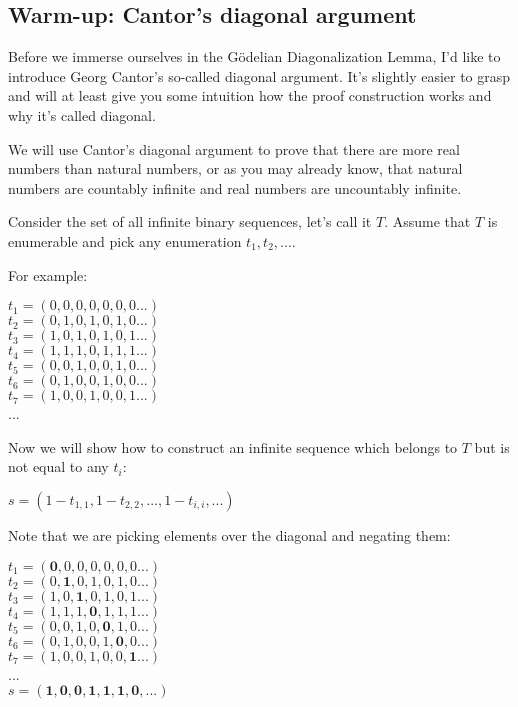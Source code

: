 \documentclass{article}
\begin{document}
\subsection{Warm-up: Cantor's diagonal argument}

Before we immerse ourselves in the Gödelian Diagonalization Lemma,
I'd like to introduce Georg Cantor's so-called diagonal argument.
It's slightly easier to grasp and will at least give you some intuition how
the proof construction works and why it's called diagonal.

We will use Cantor's diagonal argument to prove that there are more real
numbers than natural numbers, or as you may already know, that
natural numbers are countably infinite and real numbers are uncountably
infinite.

Consider the set of all infinite binary sequences, let's call it $T$.
Assume that $T$ is enumerable and pick any enumeration $t_1, t_2, ...$.

For example:

\begin{center}
    $t_1 = (0, 0, 0, 0, 0, 0, 0...)$\\
    $t_2 = (0, 1, 0, 1, 0, 1, 0 ...)$\\
    $t_3 = (1, 0, 1, 0, 1, 0, 1 ...)$\\
    $t_4 = (1, 1, 1, 0, 1, 1, 1 ...)$\\
    $t_5 = (0, 0, 1, 0, 0, 1, 0 ...)$\\
    $t_6 = (0, 1, 0, 0, 1, 0, 0 ...)$\\
    $t_7 = (1, 0, 0, 1, 0, 0, 1 ...)$\\
    ...\\
\end{center}

Now we will show how to construct an infinite sequence which belongs to
$T$ but is not equal to any $t_i$:

\begin{center}
    $s = (1-t_{1,1}, 1-t_{2,2}, ..., 1-t_{i,i}, ...)$
\end{center}

Note that we are picking elements over the diagonal and negating them:

\begin{center}
    $t_1 = (\mathbf{0}, 0, 0, 0, 0, 0, 0 ...)$\\
    $t_2 = (0, \mathbf{1}, 0, 1, 0, 1, 0 ...)$\\
    $t_3 = (1, 0, \mathbf{1}, 0, 1, 0, 1 ...)$\\
    $t_4 = (1, 1, 1, \mathbf{0}, 1, 1, 1 ...)$\\
    $t_5 = (0, 0, 1, 0, \mathbf{0}, 1, 0 ...)$\\
    $t_6 = (0, 1, 0, 0, 1, \mathbf{0}, 0 ...)$\\
    $t_7 = (1, 0, 0, 1, 0, 0, \mathbf{1} ...)$\\
    ...\\
    $s = (\mathbf{1}, \mathbf{0}, \mathbf{0}, \mathbf{1}, \mathbf{1}, \mathbf{1}, \mathbf{0}, ...)$
\end{center}
\end{document}
